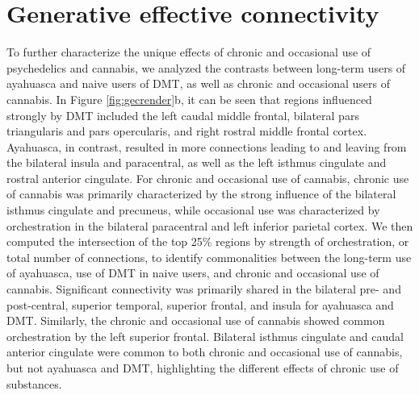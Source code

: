 \section{Generative effective
connectivity}\label{generative-effective-connectivity}

To further characterize the unique effects of chronic and occasional use
of psychedelics and cannabis, we analyzed the contrasts between long-term users of ayahuasca and naive users of DMT, as well as chronic and occasional users of cannabis. In Figure \ref{fig:gecrender}b, it can be seen that regions influenced strongly by DMT included the left caudal middle frontal, bilateral pars triangularis and pars opercularis, and right rostral middle frontal cortex. Ayahuasca, in contrast, resulted in more connections leading to and leaving from the bilateral insula and paracentral, as well as the left isthmus cingulate and rostral anterior cingulate. For chronic and occasional use of cannabis, chronic use of cannabis was primarily characterized by the strong influence of the bilateral isthmus cingulate and precuneus, while occasional use was characterized by orchestration in the bilateral paracentral and left inferior parietal cortex. We then computed the intersection of the top
25\% regions by strength of orchestration, or total number of connections, to identify commonalities between the long-term use of ayahuasca, use of DMT in naive users, and chronic and occasional use of cannabis. Significant connectivity was primarily shared in the bilateral pre- and post-central, superior temporal, superior frontal, and insula for ayahuasca and DMT. Similarly, the chronic and occasional use of cannabis showed common orchestration by the left superior frontal. Bilateral isthmus cingulate and caudal anterior cingulate were common to both chronic and occasional use of cannabis, but not ayahuasca and DMT, highlighting the different effects of chronic use of substances.


